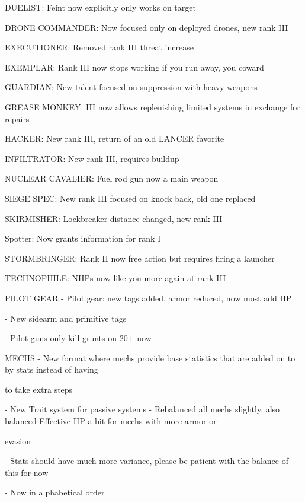 DUELIST: Feint now explicitly only works on target
 
DRONE COMMANDER: Now focused only on deployed drones, new rank III
 

EXECUTIONER: Removed rank III threat increase
 
EXEMPLAR: Rank III now stops working if you run away, you coward
 

GUARDIAN: New talent focused on suppression with heavy weapons
 
GREASE MONKEY:  III now allows replenishing limited systems in exchange for repairs
 
HACKER: New rank III, return of an old LANCER favorite
 

                                                                                                                          


INFILTRATOR: New rank III, requires buildup
 
NUCLEAR CAVALIER: Fuel rod gun now a main weapon
 
SIEGE SPEC: New rank III focused on knock back, old one replaced
 

SKIRMISHER: Lockbreaker distance changed, new rank III
 
Spotter: Now grants information for rank I
 

STORMBRINGER: Rank II now free action but requires firing a launcher
 
TECHNOPHILE: NHPs now like you more again at rank III
 

PILOT GEAR  
    -    Pilot gear: new tags added, armor reduced, now most add HP
 
    -    New sidearm and primitive tags
 
    -    Pilot guns only kill grunts on 20+ now
 

MECHS  
    -    New format where mechs provide base statistics that are added on to by stats instead of having  

         to take extra steps
 
    -    New Trait system for passive systems  
    -    Rebalanced all mechs slightly, also balanced Effective HP a bit for mechs with more armor or  

         evasion
 
    -    Stats should have much more variance, please be patient with the balance of this for now
 
    -    Now in alphabetical order
 

